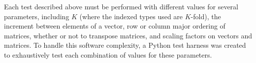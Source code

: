   Each test described above must be performed with different values for several parameters, including $K$ (where the indexed types used are $K$-fold), the increment between elements of a vector, row or column major ordering of matrices, whether or not to transpose matrices, and scaling factors on vectors and matrices. To handle this software complexity, a Python test harness was created to exhaustively test each combination of values for these parameters.
